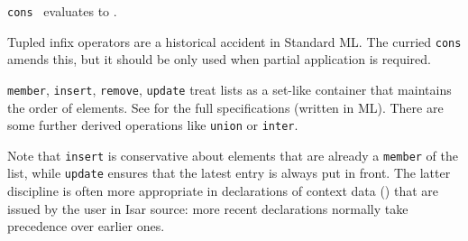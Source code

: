 \begin{isabellebody}
\begin{isamarkuptext}
  \begin{description}

  \item \verb|cons|~ evaluates to .

  Tupled infix operators are a historical accident in Standard ML.
  The curried \verb|cons| amends this, but it should be only used when
  partial application is required.

  \item \verb|member|, \verb|insert|, \verb|remove|, \verb|update| treat
  lists as a set-like container that maintains the order of elements.
  See \hyperlink{file.~~/src/Pure/library.ML}{\mbox{}} for the full specifications
  (written in ML).  There are some further derived operations like
  \verb|union| or \verb|inter|.

  Note that \verb|insert| is conservative about elements that are
  already a \verb|member| of the list, while \verb|update| ensures that
  the latest entry is always put in front.  The latter discipline is
  often more appropriate in declarations of context data
  () that are issued by the user in Isar
  source: more recent declarations normally take precedence over
  earlier ones.


\end{description}
\end{isamarkuptext}
\end{isabellebody}
